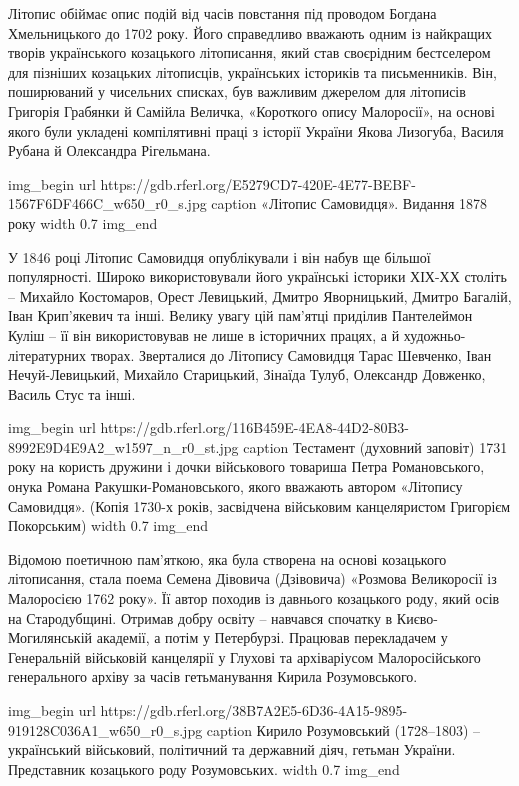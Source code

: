 Літопис обіймає опис подій від часів повстання під проводом Богдана
Хмельницького до 1702 року. Його справедливо вважають одним із найкращих творів
українського козацького літописання, який став своєрідним бестселером для
пізніших козацьких літописців, українських істориків та письменників. Він,
поширюваний у чисельних списках, був важливим джерелом для літописів Григорія
Грабянки й Самійла Величка, «Короткого опису Малоросії», на основі якого були
укладені компілятивні праці з історії України Якова Лизогуба, Василя Рубана й
Олександра Рігельмана.

\ifcmt
img_begin 
  url https://gdb.rferl.org/E5279CD7-420E-4E77-BEBF-1567F6DF466C_w650_r0_s.jpg
  caption «Літопис Самовидця». Видання 1878 року
  width 0.7
img_end
\fi

У 1846 році Літопис Самовидця опублікували і він набув ще більшої популярності.
Широко використовували його українські історики ХІХ-ХХ століть – Михайло
Костомаров, Орест Левицький, Дмитро Яворницький, Дмитро Багалій, Іван
Крип’якевич та інші. Велику увагу цій пам’ятці приділив Пантелеймон Куліш – її
він використовував не лише в історичних працях, а й художньо-літературних
творах. Зверталися до Літопису Самовидця Тарас Шевченко, Іван Нечуй-Левицький,
Михайло Старицький, Зінаїда Тулуб, Олександр Довженко, Василь Стус та інші.

\ifcmt
img_begin 
        url https://gdb.rferl.org/116B459E-4EA8-44D2-80B3-8992E9D4E9A2_w1597_n_r0_st.jpg
        caption Тестамент (духовний заповіт) 1731 року на користь дружини і
        дочки військового товариша Петра Романовського, онука Романа
        Ракушки-Романовського, якого вважають автором «Літопису Самовидця».
        (Копія 1730-х років, засвідчена військовим канцеляристом Григорієм
        Покорським)
        width 0.7
img_end
\fi

Відомою поетичною пам’яткою, яка була створена на основі козацького
літописання, стала поема Семена Дівовича (Дзівовича) «Розмова Великоросії із
Малоросією 1762 року». Її автор походив із давнього козацького роду, який осів
на Стародубщині. Отримав добру освіту – навчався спочатку в Києво-Могилянській
академії, а потім у Петербурзі. Працював перекладачем у Генеральній військовій
канцелярії у Глухові та архіваріусом Малоросійського генерального архіву за
часів гетьманування Кирила Розумовського.

\ifcmt
img_begin 
  url https://gdb.rferl.org/38B7A2E5-6D36-4A15-9895-919128C036A1_w650_r0_s.jpg
  caption Кирило Розумовський (1728–1803) – український військовий, політичний та державний діяч, гетьман України. Представник козацького роду Розумовських.
  width 0.7
img_end
\fi

